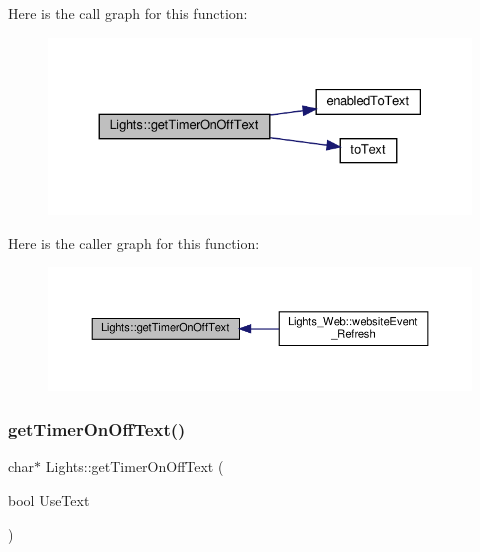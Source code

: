 Here is the call graph for this function\+:
\nopagebreak
\begin{figure}[H]
\begin{center}
\leavevmode
\includegraphics[width=330pt]{class_lights_a8899969e0175e8242f9139c17585bcd0_cgraph}
\end{center}
\end{figure}
Here is the caller graph for this function\+:
\nopagebreak
\begin{figure}[H]
\begin{center}
\leavevmode
\includegraphics[width=350pt]{class_lights_a8899969e0175e8242f9139c17585bcd0_icgraph}
\end{center}
\end{figure}
\mbox{\label{class_lights_a912d1b2e51274277f2b70a8667d6bd6b}} 
\subsubsection{\texorpdfstring{get\+Timer\+On\+Off\+Text()}{getTimerOnOffText()}\hspace{0.1cm}{\footnotesize\ttfamily [2/2]}}
{\footnotesize\ttfamily char$\ast$ Lights\+::get\+Timer\+On\+Off\+Text (\begin{DoxyParamCaption}\item[{bool}]{Use\+Text }\end{DoxyParamCaption})}

\mbox{\label{class_lights_a38c74606e1c2b4ff7db184920b225961}} 
